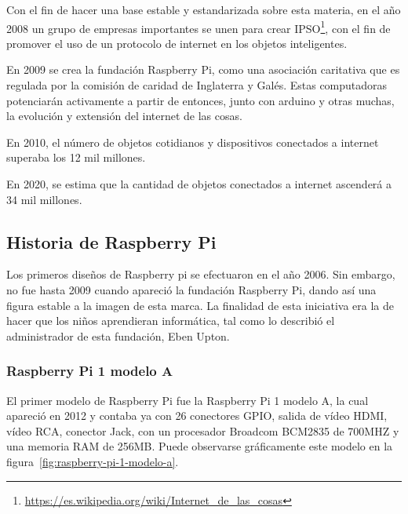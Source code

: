 Con el fin de hacer una base estable y estandarizada sobre esta materia, en el año 2008 un grupo de empresas importantes se unen para crear IPSO\footnote{\url{https://es.wikipedia.org/wiki/Internet_de_las_cosas}}, con el fin de promover el uso de un protocolo de internet en los objetos inteligentes.

En 2009 se crea la fundación Raspberry Pi\cite{rubenandres2019}, como una asociación caritativa que es regulada por la comisión de caridad de Inglaterra y Galés. Estas computadoras potenciarán activamente a partir de entonces, junto con arduino y otras muchas, la evolución y extensión del internet de las cosas.

En 2010, el número de objetos cotidianos y dispositivos conectados a internet superaba los 12 mil millones\cite{daveevans2011}.

En 2020, se estima que la cantidad de objetos conectados a internet ascenderá a 34 mil millones\cite{martinfernandez2017}.

\subsection{Historia de Raspberry Pi}

\noindent Los primeros diseños de Raspberry pi se efectuaron en el año 2006. Sin embargo, no fue hasta 2009 cuando apareció la fundación Raspberry Pi, dando así una figura estable a la imagen de esta marca. La finalidad de esta iniciativa era la de hacer que los niños aprendieran informática, tal como lo describió el administrador de esta fundación, Eben Upton.

\subsubsection{Raspberry Pi 1 modelo A}

\noindent El primer modelo de Raspberry Pi fue la Raspberry Pi 1 modelo A, la cual apareció en 2012 y contaba ya con 26 conectores GPIO, salida de vídeo HDMI, vídeo RCA, conector Jack, con un procesador Broadcom BCM2835 de 700MHZ y una memoria RAM de 256MB. Puede observarse gráficamente este modelo en la figura~\ref{fig:raspberry-pi-1-modelo-a}.


